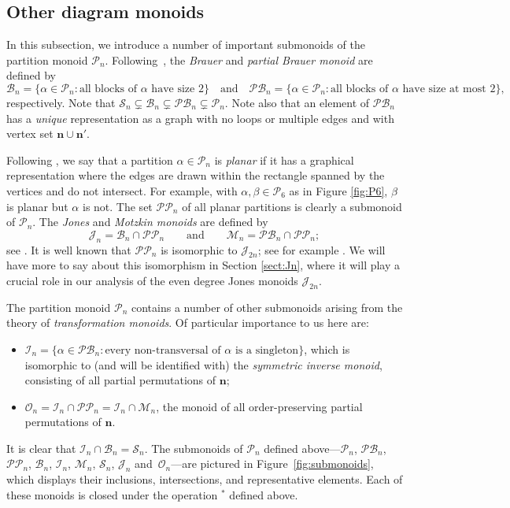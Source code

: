 \documentclass[11pt,a4paper]{article}
\newcommand{\PP}{\mathscr{P}\P}
\newcommand{\M}{\mathcal M}
\renewcommand{\O}{\mathcal O}
\newcommand{\I}{\mathcal I}
\renewcommand{\S}{\mathcal S}
\newcommand{\B}{\mathcal B}
\renewcommand{\P}{\mathcal P}
\newcommand{\PB}{\mathcal{PB}}
\newcommand{\J}{\mathcal J}
\newcommand{\bn}{\mathbf{n}}
\newcommand{\al}{\alpha}
\newcommand{\be}{\beta}
\newcommand{\set}[2]{\{ {#1} : {#2} \}}
\newcommand{\1}{\id_n}
\newcommand{\suq}{\subsetneq}
\newcommand{\AND}{\qquad\text{and}\qquad}
\newcommand{\ANd}{\quad\text{and}\quad}
\newcommand{\bit}{\begin{itemize}}
\newcommand{\eit}{\end{itemize}}
\numberwithin{equation}{section}
\theoremstyle{definition}
\begin{document}
\subsection{Other diagram monoids}\label{sect:prelim_other}


In this subsection, we introduce a number of important submonoids of the partition monoid $\P_n$.
Following~\cite{Maz1998},
the \emph{Brauer} and \emph{partial Brauer monoid} are defined by
\[
\B_n = \set{\al\in\P_n}{\text{all blocks of $\al$ have size $2$}} \ANd
\PB_n = \set{\al\in\P_n}{\text{all blocks of $\al$ have size at most $2$}},
\]
respectively.  Note that $\S_n\suq\B_n\suq\PB_n\suq\P_n$.  Note also that an
element of $\PB_n$ has a \emph{unique} representation as a 
graph with no loops or multiple edges and with vertex set $\bn\cup\bn'$.

Following \cite{Jones1994_2}, we say that a partition $\al\in\P_n$ is
\emph{planar} if it has a graphical representation where 
the edges are drawn within the rectangle spanned by the vertices and do not intersect.
For example, with $\al,\be\in\P_6$ as in
Figure \ref{fig:P6}, $\be$ is planar but $\al$ is not.  The set
$\mathscr{P}\P_n$ of all planar partitions is clearly a submonoid of $\P_n$.
The \emph{Jones} and \emph{Motzkin monoids} are defined by
\[
\J_n = \B_n \cap \PP_n \AND \M_n=\PB_n\cap\PP_n;
\]
see \cite{HLP2013,LF2006}.  It is well known \cite{HR2005,Jones1994_2} that $\PP_n$ is isomorphic to $\J_{2n}$; see for example \cite[p873]{HR2005}.  We will have more to say about this isomorphism in Section \ref{sect:Jn}, where it will play a crucial role in our analysis of the even degree Jones monoids $\J_{2n}$.  

The partition monoid $\P_n$ contains a number of other submonoids arising from the theory of \emph{transformation monoids}.  
Of particular importance to us here are:
\bit
\item
$\I_n = \set{\al\in\PB_n}{\text{every non-transversal of $\al$ is a singleton}}$,
which is isomorphic to (and will be identified with) the \emph{symmetric inverse monoid},
consisting of all partial permutations of $\bn$;
\item
$\O_n=\I_n\cap\PP_n=\I_n\cap\M_n$, the monoid of all order-preserving partial permutations of $\bn$.
\eit
It is clear that $\I_n\cap\B_n=\S_n$.
%
The submonoids of $\P_n$ defined above---$\P_n$, $\PB_n$, $\PP_n$, $\B_n$,
$\I_n$, $\M_n$, $\S_n$, $\J_n$ and~$\O_n$---are pictured in
Figure~\ref{fig:submonoids}, which displays their inclusions, intersections,
and representative elements.  Each of these monoids is closed under the
operation ${}^*$ defined above.
\end{document}
